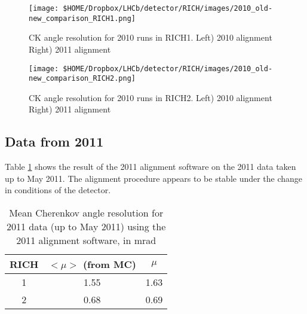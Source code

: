 \begin{figure}[h]
	\begin{center}
		\texttt{[image: \$HOME/Dropbox/LHCb/detector/RICH/images/2010\_old-new\_comparison\_RICH1.png]}
		\caption{CK angle resolution for 2010 runs in RICH1. Left) 2010 alignment Right) 2011 alignment}
		\label{fig: resolution_plot_RICH1_full_reconstruction}
	\end{center}
\end{figure}

\begin{figure}[h]
	\begin{center}
		\texttt{[image: \$HOME/Dropbox/LHCb/detector/RICH/images/2010\_old-new\_comparison\_RICH2.png]}
		\caption{CK angle resolution for 2010 runs in RICH2. Left) 2010 alignment Right) 2011 alignment}
		\label{fig: resolution_plot_RICH2_full_reconstruction}
	\end{center}
\end{figure}

\subsection{Data from 2011}

Table \ref{tab:mean Cherenkov angle resolution 2011 data} shows the result of the 2011 alignment software on the 2011 data taken up to May 2011. The alignment procedure appears to be stable under the change in conditions of the detector.

\begin{table}[htdp]
	\begin{center}
		\caption{Mean Cherenkov angle resolution for 2011 data (up to May 2011) using the 2011 alignment software, in mrad}
		\begin{tabular}{|c|c|c|}
			\hline
			RICH & $<\mu>$ (from MC) & $\mu$ \\
			\hline
			1 & 1.55 & 1.63 \\
			2 & 0.68 & 0.69 \\
			\hline
		\end{tabular}
		\label{tab:mean Cherenkov angle resolution 2011 data}
	\end{center}
\end{table}
